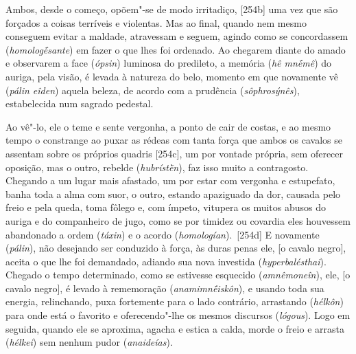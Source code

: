 Ambos, desde o começo, opõem"-se de modo irritadiço, [254b] uma vez
que são forçados a coisas terríveis e violentas. Mas ao final, quando
nem mesmo conseguem evitar a maldade, atravessam e seguem, agindo como
se concordassem (\emph{homologḗsante}) em fazer o que lhes foi ordenado.
Ao chegarem diante do amado e observarem a face (\emph{ópsin}) luminosa
do predileto, a memória (\emph{hê mnḗmê}) do auriga, pela visão, é
levada à natureza do belo, momento em que novamente vê (\emph{pálin
eîden}) aquela beleza, de acordo com a prudência (\emph{sôphrosýnês}),
estabelecida num sagrado pedestal.

Ao vê"-lo, ele o teme e sente vergonha, a ponto de cair de costas, e ao
mesmo tempo o constrange ao puxar as rédeas com tanta força que ambos os
cavalos se assentam sobre os próprios quadris [254c], um por vontade
própria, sem oferecer oposição, mas o outro, rebelde (\emph{hubrístḕn}),
faz isso muito a contragosto. Chegando a um lugar mais afastado, um por
estar com vergonha e estupefato, banha toda a alma com suor, o outro,
estando apaziguado da dor, causada pelo freio e pela queda, toma fôlego
e, com ímpeto, vitupera os muitos abusos do auriga e do companheiro de
jugo, como se por timidez ou covardia eles houvessem abandonado a ordem
(\emph{táxin}) e o acordo (\emph{homologían}).~[254d] E novamente
(\emph{pálin}), não desejando ser conduzido à força, às duras penas ele,
[o cavalo negro], aceita o que lhe foi demandado, adiando sua nova
investida (\emph{hyperbalésthai}). Chegado o tempo determinado, como se
estivesse esquecido (\emph{amnêmoneîn}), ele, [o cavalo negro], é
levado à rememoração (\emph{anamimnḗiskôn}), e usando toda sua energia,
relinchando, puxa fortemente para o lado contrário, arrastando
(\emph{hélkôn}) para onde está o favorito e oferecendo"-lhe os mesmos
discursos (\emph{lógous}). Logo em seguida, quando ele se aproxima,
agacha e estica a calda, morde o freio e arrasta (\emph{hélkei}) sem
nenhum pudor (\emph{anaideías}).

